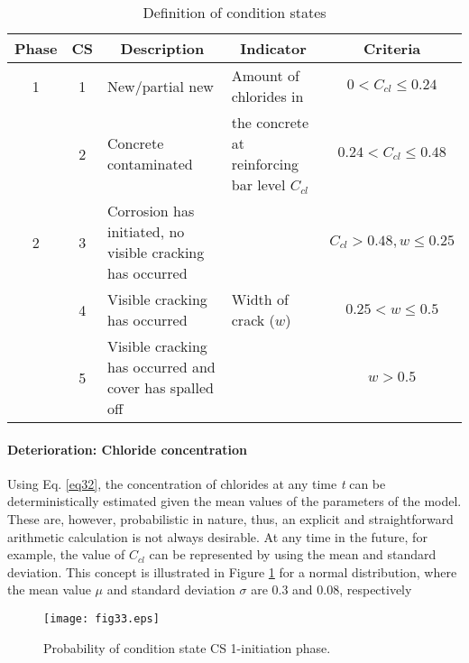 \begin{table}
	\caption{Definition of condition states} \label{tbl:33}
		\begin{tabular}{|l|l|p{3.5cm}|p{5.5cm}|l|}
\hline
\multicolumn{1}{|c|}{Phase} & \multicolumn{1}{c|}{CS} & \multicolumn{1}{c|}{Description} & \multicolumn{1}{c|}{Indicator} & \multicolumn{1}{c|}{Criteria} \\ 
\hline
\multicolumn{1}{|c|}{1} & \multicolumn{1}{c|}{1} & New/partial new & Amount of chlorides in & \multicolumn{1}{c|}{$0 < C_{cl}\le 0.24$} \\ 
\cline{2-3}\cline{5-5}
\multicolumn{1}{|c|}{} & \multicolumn{1}{c|}{2} & Concrete contaminated & the concrete at reinforcing bar level $C_{cl}$ & \multicolumn{1}{c|}{$0.24 < C_{cl}\le 0.48$} \\ 
\hline
\multicolumn{1}{|c|}{2} & \multicolumn{1}{c|}{3} & Corrosion has initiated, no visible cracking has occurred & \multicolumn{1}{c|}{} & \multicolumn{1}{c|}{$C_{cl}> 0.48, w\le 0.25$} \\ 
\cline{2-3}\cline{5-5}
\multicolumn{1}{|c|}{} & \multicolumn{1}{c|}{4} & Visible cracking has occurred & Width of crack ($w$) & \multicolumn{1}{c|}{$0.25 < w \le 0.5$} \\ 
\cline{2-3}\cline{5-5}
\multicolumn{1}{|c|}{} & \multicolumn{1}{c|}{5} & Visible cracking has occurred and cover has spalled off & \multicolumn{1}{c|}{} & \multicolumn{1}{c|}{$ w > 0.5$} \\ 
\hline
\end{tabular}
\end{table}

\paragraph{Deterioration: Chloride concentration}

Using Eq. \eqref{eq32}, the concentration of chlorides at any time \textit{t} can be deterministically estimated given the mean values of the parameters of the model. These are, however, probabilistic in nature, thus, an explicit and straightforward arithmetic calculation is not always desirable. At any time in the future, for example, the value of ${C_{cl}}$ can be represented by using the mean and standard deviation. This concept is illustrated in Figure \ref{fig:33} for a normal distribution, where the mean value $\mu$ and standard deviation $\sigma$ are 0.3 and 0.08, respectively

\begin{figure}[h]
\texttt{[image: fig33.eps]}
\caption{Probability of condition state CS 1-initiation phase.}\label{fig:33}
\end{figure}
 
